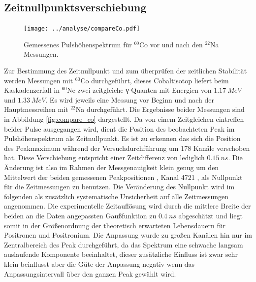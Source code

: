 \documentclass[a4paper,12pt]{article}
\begin{document}
\subsection{Zeitnullpunktsverschiebung}\label{cap:zeitverschiebung}
\begin{figure}
	\texttt{[image: ../analyse/compareCo.pdf]}
	\caption{Gemessenes Pulshöhenspektrum für $^{60}$Co vor und nach den $^{22}$Na Messungen.}
	\label{fig:timepuls}
\end{figure}
Zur Bestimmung des Zeitnullpunkt und zum überprüfen der zeitlichen Stabilität werden Messungen mit $^{60}$Co durchgeführt, dieses Cobaltisotop liefert
beim Kaskadenzerfall in $^{60}$Ne zwei zeitgleiche γ-Quanten mit Energien von $\SI{1.17}{MeV}$ und $\SI{1.33}{MeV}$. Es wird jeweils eine Messung vor Beginn
und nach der Hauptmessreihen mit $^{22}$Na durchgeführt. Die Ergebnisse beider Messungen sind in Abbildung \ref{fig:compare_co} dargestellt.
Da von einem Zeitgleichen eintreffen beider Pulse ausgegangen wird, dient die Position des beobachteten Peak im Pulshöhenspektrum als Zeitnullpunkt. Es
ist zu erkennen das sich die Position des Peakmaximum während der Versuchdurchführung um 178 Kanäle verschoben hat. Diese Verschiebung entspricht einer
Zeitdifferenz von lediglich $\SI{0.15}{ns}$. Die Änderung ist also im Rahmen der Messgenauigkeit klein genug um den Mittelwert der
beiden gemessenen Peakpositionen , Kanal 4721 , als Nullpunkt für die Zeitmessungen zu benutzen. Die Veränderung des Nullpunkt wird im folgenden
als zusätzlich systematische Unsicherheit auf alle Zeitmessungen angenommen. Die experimentelle Zeitauflösung wird durch die mittlere Breite der beiden an die
Daten angepassten Gaußfunktion zu $\SI{0.4}{ns}$ abgeschätzt und liegt somit in der Größenordnung der theoretisch erwarteten Lebensdauern für Positronen und Positronium.
Die Anpassung wurde zu großen Kanälen hin nur im Zentralbereich des Peak durchgeführt, da das Spektrum eine schwache langsam auslaufende Komponente beeinhaltet, 
dieser zusätzliche Einfluss ist zwar sehr klein beinflusst aber die Güte der Anpassung negativ wenn das Anpassungsintervall über den ganzen Peak gewählt wird.
\end{document}
